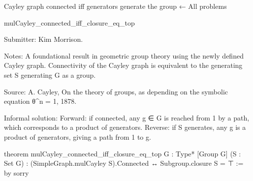 Cayley graph connected iff generators generate the group
← All problems

mulCayley_connected_iff_closure_eq_top

Submitter: Kim Morrison.

Notes: A foundational result in geometric group theory using the newly defined Cayley graph. Connectivity of the Cayley graph is equivalent to the generating set S generating G as a group.

Source: A. Cayley, On the theory of groups, as depending on the symbolic equation θ^n = 1, 1878.

Informal solution: Forward: if connected, any g ∈ G is reached from 1 by a path, which corresponds to a product of generators. Reverse: if S generates, any g is a product of generators, giving a path from 1 to g.

theorem mulCayley_connected_iff_closure_eq_top {G : Type*} [Group G]
    (S : Set G) :
    (SimpleGraph.mulCayley S).Connected ↔ Subgroup.closure S = ⊤ := by
  sorry